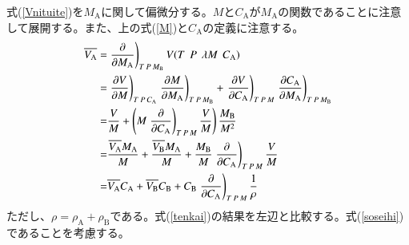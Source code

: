 \documentclass[a4paper,12pt, oneside, openany]{jsbook}
\begin{document}
\noindent 式(\ref{Vnituite})を$M_\mathrm{A}$に関して偏微分する。$M$と$C_\mathrm{A}$が$M_\mathrm{A}$の関数であることに注意して展開する。また、上の式(\ref{M})と$C_\mathrm{A}$の定義に注意する。
\begin{equation}\label{tenkai}
\begin{split}
  \overline{V_\mathrm{A}}=&\left.\frac{\partial}{\partial M_\mathrm{A}}\right)_{T\hspace{0.5mm}P\hspace{0.5mm}M_\mathrm{B}}V(T\hspace{1.5mm}  P\hspace{1.5mm} \lambda M \hspace{1.5mm}C_\mathrm{A})\\=&\left.\frac{\partial V}{\partial M}\right)_{T\hspace{0.5mm}P\hspace{0.5mm}C_\mathrm{A}}\left.\frac{\partial M}{\partial M_\mathrm{A}}\right)_{T\hspace{0.5mm}P\hspace{0.5mm}M_\mathrm{B}}+\left.\frac{\partial V}{\partial C_\mathrm{A}}\right)_{T\hspace{0.5mm}P\hspace{0.5mm}M}\left.\frac{\partial C_\mathrm{A}}{\partial M_\mathrm{A}}\right)_{T\hspace{0.5mm}P\hspace{0.5mm}M_\mathrm{B}}\\
  =&\frac{V}{M}+\left(M\left.\frac{\partial}{\partial C_\mathrm{A}}\right)_{T\hspace{0.5mm}P\hspace{0.5mm}M} \frac{V}{M} \right)\frac{M_\mathrm{B}}{M^2}\\
  =&\frac{\overline{V_\mathrm{A}}M_\mathrm{A}}{M}+\frac{\overline{V_\mathrm{B}}M_\mathrm{A}}{M}+\frac{M_\mathrm{B}}{M}\left.\frac{\partial}{\partial C_\mathrm{A}}\right)_{T\hspace{0.5mm}P\hspace{0.5mm}M} \frac{V}{M}\\
  =&\overline{V_{\mathrm{A}}}C_\mathrm{A}+\overline{V_{\mathrm{B}}}C_\mathrm{B}+C_\mathrm{B}\left.\frac{\partial}{\partial C_\mathrm{A}}\right)_{T\hspace{0.5mm}P\hspace{0.5mm}M}\frac{1}{\rho}
\end{split}
\end{equation}
ただし、$\rho=\rho_\mathrm{A}+\rho_\mathrm{B}$である。式(\ref{tenkai})の結果を左辺と比較する。式(\ref{soseihi})であることを考慮する。
\end{document}
